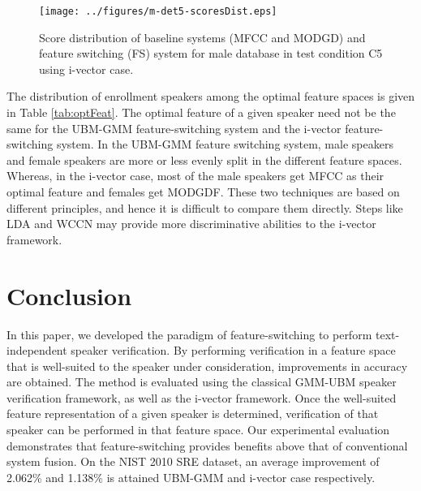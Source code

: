 \documentclass[preprint,12pt,5p]{elsarticle}
\begin{document}
\begin{figure*}[h!tb]
\centering
\texttt{[image: ../figures/m-det5-scoresDist.eps]}
\caption{Score distribution of baseline systems (MFCC and MODGD) and feature switching (FS) system for male database in test condition C5 using i-vector case.}
\label{fig:scoreDist}
\end{figure*}




The distribution of enrollment speakers among the optimal feature spaces
is given in Table \ref{tab:optFeat}. The optimal feature of a given speaker need
not be the same for the UBM-GMM feature-switching system and the i-vector
feature-switching system. %
In the UBM-GMM feature switching system, male speakers and female speakers are more or less
evenly split in the different feature spaces. Whereas, in the i-vector case, most of the male 
speakers get MFCC as their optimal feature and females get MODGDF. These two techniques are 
based on different principles, and hence it is difficult to compare them directly. Steps like LDA and 
WCCN may provide more discriminative abilities to the i-vector framework.


\section{Conclusion}
\label{sec:conclude}

In this paper, we developed the paradigm of feature-switching to perform
text-independent speaker verification. By performing verification in a
feature space that is well-suited to the speaker under consideration,
improvements in accuracy are obtained. The method is evaluated using the
classical GMM-UBM speaker verification framework, as well as the i-vector
framework. Once the well-suited feature representation of a given speaker is
determined, verification of that speaker can be performed in that feature space.
Our experimental evaluation demonstrates that feature-switching
provides benefits above that of conventional system fusion. On the NIST 2010 SRE
dataset, an average improvement of 2.062\% and 1.138\% is attained UBM-GMM and i-vector case respectively.
\end{document}
